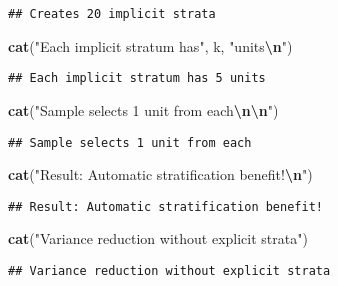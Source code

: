 \documentclass[
]{article}
\newenvironment{Shaded}{\begin{snugshade}}{\end{snugshade}}
\newcommand{\FunctionTok}[1]{\textcolor[rgb]{0.13,0.29,0.53}{\textbf{#1}}}
\newcommand{\NormalTok}[1]{#1}
\newcommand{\SpecialCharTok}[1]{\textcolor[rgb]{0.81,0.36,0.00}{\textbf{#1}}}
\newcommand{\StringTok}[1]{\textcolor[rgb]{0.31,0.60,0.02}{#1}}
\begin{document}
\begin{verbatim}
## Creates 20 implicit strata
\end{verbatim}

\begin{Shaded}
\begin{Highlighting}[]
\FunctionTok{cat}\NormalTok{(}\StringTok{"Each implicit stratum has"}\NormalTok{, k, }\StringTok{"units}\SpecialCharTok{\textbackslash{}n}\StringTok{"}\NormalTok{)}
\end{Highlighting}
\end{Shaded}

\begin{verbatim}
## Each implicit stratum has 5 units
\end{verbatim}

\begin{Shaded}
\begin{Highlighting}[]
\FunctionTok{cat}\NormalTok{(}\StringTok{"Sample selects 1 unit from each}\SpecialCharTok{\textbackslash{}n\textbackslash{}n}\StringTok{"}\NormalTok{)}
\end{Highlighting}
\end{Shaded}

\begin{verbatim}
## Sample selects 1 unit from each
\end{verbatim}

\begin{Shaded}
\begin{Highlighting}[]
\FunctionTok{cat}\NormalTok{(}\StringTok{"Result: Automatic stratification benefit!}\SpecialCharTok{\textbackslash{}n}\StringTok{"}\NormalTok{)}
\end{Highlighting}
\end{Shaded}

\begin{verbatim}
## Result: Automatic stratification benefit!
\end{verbatim}

\begin{Shaded}
\begin{Highlighting}[]
\FunctionTok{cat}\NormalTok{(}\StringTok{"Variance reduction without explicit strata"}\NormalTok{)}
\end{Highlighting}
\end{Shaded}

\begin{verbatim}
## Variance reduction without explicit strata
\end{verbatim}
\end{document}
